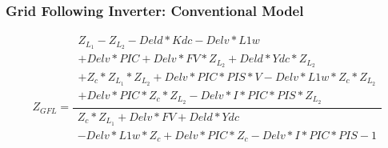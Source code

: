 \subsubsection{Grid Following Inverter: Conventional Model}
\begin{center}
\begin{equation}\label{4}
Z_{GFL}=
\frac
{
\begin{split}
Z_L_1 - Z_L_2 - Deld*Kdc - Delv*L1w\\ + Delv*PIC + Delv*FV*Z_L_2 + Deld*Ydc*Z_L_2\\ + Z_c*Z_L_1*Z_L_2 + Delv*PIC*PIS*V - Delv*L1w*Z_c*Z_L_2\\ + Delv*PIC*Z_c*Z_L_2 - Delv*I*PIC*PIS*Z_L_2
\end{split}}
{\begin{split}Z_c*Z_L_1 + Delv*FV + Deld*Ydc\\ - Delv*L1w*Z_c + Delv*PIC*Z_c - Delv*I*PIC*PIS - 1\end{split}}
\end{equation}
\end{center}


\pagebreak
